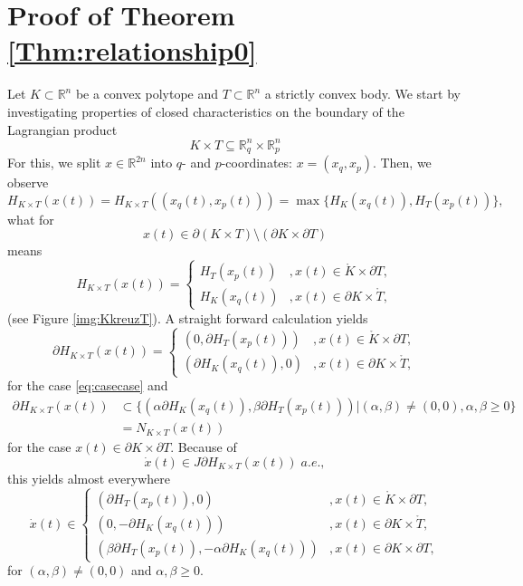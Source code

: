 \documentclass[12pt]{amsart}
\theoremstyle{plain}
\theoremstyle{remark}
\theoremstyle{definition}
\newcommand{\R}{\mathbb{R}}
\def\beq{\begin{equation}}\def\eeq{\end{equation}}
\def\beqq{\begin{equation*}}\def\eeqq{\end{equation*}}
\begin{document}
\section{Proof of Theorem \ref{Thm:relationship0}}\label{Sec:relationship0proof}

Let $K\subset\R^n$ be a convex polytope and $T\subset\R^n$ a strictly convex body. We start by investigating properties of closed characteristics on the boundary of the Lagrangian product
\beqq K\times T\subseteq \R^n_q \times \R^n_p\eeqq
For this, we split $x\in\R^{2n}$ into $q$- and $p$-coordinates: $x=(x_q,x_p)$. Then, we observe
\beqq H_{K\times T}(x(t))=H_{K\times T}((x_q(t),x_p(t)))=\max \{H_K(x_q(t)),H_T(x_p(t))\},\eeqq
what for
\beq x(t)\in \partial (K\times T)\setminus (\partial K \times \partial T)\label{eq:casecase}\eeq
means
\beqq H_{K\times T}(x(t))=\begin{cases}H_T(x_p(t)) & ,x(t)\in \mathring{K}\times \partial T,\\ H_K(x_q(t))&, x(t)\in \partial K\times \mathring{T},\end{cases}\eeqq
(see Figure \ref{img:KkreuzT}). A straight forward calculation yields
\beqq \partial H_{K\times T}(x(t))=\begin{cases}(0,\partial H_T(x_p(t)))&, x(t)\in \mathring{K}\times \partial T, \\ (\partial H_K(x_q(t)),0) & , x(t)\in\partial K\times \mathring{T},\end{cases}\eeqq
for the case \eqref{eq:casecase} and 
\begin{align*}
\partial H_{K\times T}(x(t))&\subset \{(\alpha\partial H_K(x_q(t)),\beta\partial H_T(x_p(t)))\vert (\alpha,\beta)\neq (0,0), \alpha,\beta \geq 0\}\\
&=N_{K\times T}(x(t))
\end{align*}
for the case $x(t)\in\partial K\times \partial T$. Because of
\beqq \dot{x}(t)\in J\partial H_{K\times T}(x(t))\; a.e.,\eeqq
this yields almost everywhere
\beq \dot{x}(t)\in \begin{cases}(\partial H_T(x_p(t)),0) & , x(t)\in \mathring{K}\times \partial T, \\
(0,-\partial H_K(x_q(t))) & , x(t)\in \partial K \times \mathring{T}, \\
(\beta \partial H_T(x_p(t)),-\alpha \partial H_K(x_q(t))) & , x(t)\in \partial K \times \partial T,
\end{cases}\label{eq:systemofKxT}\eeq
for $(\alpha,\beta)\neq (0,0)$ and $\alpha, \beta \geq 0$.
\end{document}
